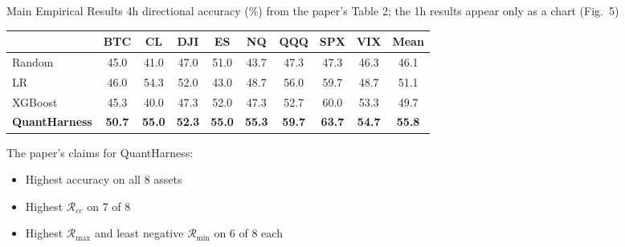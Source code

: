 \documentclass{beamer}
\begin{document}
    \begin{frame}{Main Empirical Results}
        \footnotesize
        4h directional accuracy (\%) from the paper's Table 2; the 1h results appear only as a chart (Fig.~5)

        \vspace{0.8em}
        {\footnotesize
        \setlength{\tabcolsep}{3.5pt}
        \renewcommand{\arraystretch}{1.2}
        \begin{tabular}{lccccccccc}
            \toprule
            & BTC & CL & DJI & ES & NQ & QQQ & SPX & VIX & Mean \\
            \midrule
            Random & 45.0 & 41.0 & 47.0 & 51.0 & 43.7 & 47.3 & 47.3 & 46.3 & 46.1 \\
            LR & 46.0 & 54.3 & 52.0 & 43.0 & 48.7 & 56.0 & 59.7 & 48.7 & 51.1 \\
            XGBoost & 45.3 & 40.0 & 47.3 & 52.0 & 47.3 & 52.7 & 60.0 & 53.3 & 49.7 \\
            \rowcolor{blue!10}
            \textbf{QuantHarness} & \textbf{50.7} & \textbf{55.0} & \textbf{52.3} & \textbf{55.0} & \textbf{55.3} & \textbf{59.7} & \textbf{63.7} & \textbf{54.7} & \textbf{55.8} \\
            \bottomrule
        \end{tabular}\par}

        \vspace{1.2em}
        The paper's claims for QuantHarness:
        \begin{itemize}
            \item Highest accuracy on all 8 assets
            \item Highest $\mathcal{R}_{cc}$ on 7 of 8
            \item Highest $\mathcal{R}_{\max}$ and least negative $\mathcal{R}_{\min}$ on 6 of 8 each
        \end{itemize}
    \end{frame}
\end{document}
